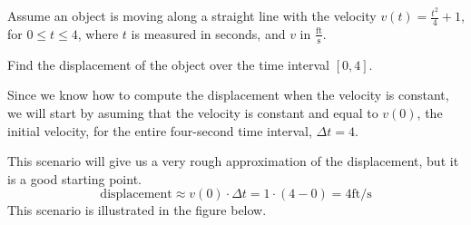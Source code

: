 \documentclass{ximera}
\begin{document}
\begin{example}
  Assume an object is moving along a straight line with the velocity
  $v(t)=\frac{t^2}{4}+1$, for $0\le t\le4$, where $t$ is measured in
  seconds, and $v$ in $\frac{\mathrm{ft}}{\mathrm{s}}$.
  
  Find the displacement of the object over the time interval $[0,4]$. 
  \begin{explanation}
   Since we know how to compute the displacement when the velocity is
   constant, we will start by asuming that the velocity is constant
   and equal to $v(0)$, the initial velocity, for the entire
   four-second time interval, $\Delta t=4$.
   
   This scenario will give us a very rough approximation of the
   displacement, but it is a good starting point.
  \[
   \text{displacement}\approx v(0)\cdot\Delta t=1\cdot(4-0)=4 \mathrm{ft}/\mathrm{s}
  \]
This scenario is illustrated in the figure below.
 \begin{image}
\end{image}
\end{explanation}
\end{example}
\end{document}
